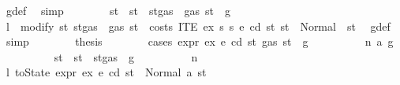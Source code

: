 \begin{isabellebody}
\ g{\isacharunderscore}{\kern0pt}def\ \isamarkupfalse%
\ simp\isanewline
\ \ \ \ \ \ \isamarkupfalse%
\ st{\isacharprime}{\kern0pt}\ \ {\isachardoublequoteopen}st{\isacharprime}{\kern0pt}\ {\isacharequal}{\kern0pt}\ st{\isasymlparr}gas\ {\isacharcolon}{\kern0pt}{\isacharequal}{\kern0pt}\ gas\ st\ {\isacharminus}{\kern0pt}\ g{\isasymrparr}{\isachardoublequoteclose}\isanewline
\ \ \ \ \ \ \isamarkupfalse%
\ \isamarkupfalse%
\ l{}{\isacharcolon}{\kern0pt}\ {\isachardoublequoteopen}\ modify\ {\isacharparenleft}{\kern0pt}{\isasymlambda}st{\isachardot}{\kern0pt}\ st{\isasymlparr}gas\ {\isacharcolon}{\kern0pt}{\isacharequal}{\kern0pt}\ gas\ st\ {\isacharminus}{\kern0pt}\ costs\ {\isacharparenleft}{\kern0pt}ITE\ ex\ s{}\ s{}{\isacharparenright}{\kern0pt}\ e\ cd\ st{\isasymrparr}{\isacharparenright}{\kern0pt}\ st\ {\isacharequal}{\kern0pt}\ Normal\ {\isacharparenleft}{\kern0pt}{\isacharparenleft}{\kern0pt}{\isacharparenright}{\kern0pt}{\isacharcomma}{\kern0pt}\ st{\isacharprime}{\kern0pt}{\isacharparenright}{\kern0pt}{\isachardoublequoteclose}\ \isamarkupfalse%
\ g{\isacharunderscore}{\kern0pt}def\ \isamarkupfalse%
\ simp\isanewline
\ \ \ \ \ \ \isamarkupfalse%
\ {\isacharquery}{\kern0pt}thesis\isanewline
\ \ \ \ \ \ \isamarkupfalse%
\ {\isacharparenleft}{\kern0pt}cases\ {\isachardoublequoteopen}expr\ ex\ e\ cd\ st{\isacharprime}{\kern0pt}\ {\isacharparenleft}{\kern0pt}gas\ st\ {\isacharminus}{\kern0pt}\ g{\isacharparenright}{\kern0pt}{\isachardoublequoteclose}{\isacharparenright}{\kern0pt}\isanewline
\ \ \ \ \ \ \ \ \isamarkupfalse%
\ {\isacharparenleft}{\kern0pt}n\ a\ g{\isacharprime}{\kern0pt}{\isacharparenright}{\kern0pt}\isanewline
\ \ \ \ \ \ \ \ \isamarkupfalse%
\ st{\isacharprime}{\kern0pt}{\isacharprime}{\kern0pt}\ \ {\isachardoublequoteopen}st{\isacharprime}{\kern0pt}{\isacharprime}{\kern0pt}\ {\isacharequal}{\kern0pt}\ st{\isacharprime}{\kern0pt}{\isasymlparr}gas\ {\isacharcolon}{\kern0pt}{\isacharequal}{\kern0pt}\ g{\isacharprime}{\kern0pt}{\isasymrparr}{\isachardoublequoteclose}\isanewline
\ \ \ \ \ \ \ \ \isamarkupfalse%
\ n\ \isamarkupfalse%
\ l{}{\isacharcolon}{\kern0pt}\ {\isachardoublequoteopen}toState\ {\isacharparenleft}{\kern0pt}expr\ ex\ e\ cd{\isacharparenright}{\kern0pt}\ st{\isacharprime}{\kern0pt}\ {\isacharequal}{\kern0pt}\ Normal\ {\isacharparenleft}{\kern0pt}a{\isacharcomma}{\kern0pt}\ st{\isacharprime}{\kern0pt}{\isacharprime}{\kern0pt}{\isacharparenright}{\kern0pt}{\isachardoublequoteclose}\ \isamarkupfalse%

\end{isabellebody}
